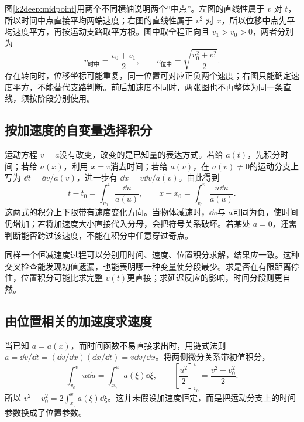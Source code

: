 图\ref{k2deep:midpoint}用两个不同横轴说明两个“中点”。左图的直线性属于 $v$ 对 $t$，所以时间中点直接平均两端速度；右图的直线性属于 $v^2$ 对 $x$，所以位移中点先平均速度平方，再按运动支路取平方根。图中取全程正向且 $v_1>v_0>0$，两者分别为
\[
 v_{\text{时中}}=\frac{v_0+v_1}{2},\qquad
 v_{\text{位中}}=\sqrt{\frac{v_0^2+v_1^2}{2}}.
\]
存在转向时，位移坐标可能重复，同一位置可对应正负两个速度；右图只能确定速度平方，不能替代支路判断。前后加速度不同时，两张图也不再整体为同一条直线，须按阶段分别使用。


\subsection{按加速度的自变量选择积分}
运动方程 $\dot v=a$没有改变，改变的是已知量的表达方式。若给 $a(t)$，先积分时间；若给 $a(x)$，利用 $\dot x=v$消去时间；若给 $a(v)$，在 $a(v)\ne0$的运动分支上写为 $\dd t=\dd v/a(v)$，进一步有 $\dd x=v\dd v/a(v)$。由此得到
\[t-t_0=\int_{v_0}^{v}\frac{\dd u}{a(u)},\qquad
x-x_0=\int_{v_0}^{v}\frac{u\dd u}{a(u)}.\]
这两式的积分上下限带有速度变化方向。当物体减速时，$\dd v$与 $a$可同为负，使时间仍增加；若将加速度大小直接代入分母，会把符号关系破坏。若某处 $a=0$，还需判断能否跨过该速度，不能在积分中任意穿过奇点。

同样一个恒减速度过程可以分别用时间、速度、位置积分求解，结果应一致。这种交叉检查能发现初值遗漏，也能表明哪一种变量使分段最少。求是否在有限距离停住，位置积分可能比求完整 $v(t)$更直接；求延迟反应的影响，时间分段则更自然。

\subsection{由位置相关的加速度求速度}
当已知 $a=a(x)$，而时间函数不易直接求出时，用链式法则 $a=\dd v/\dd t=(\dd v/\dd x)(\dd x/\dd t)=v\dd v/\dd x$。将两侧微分关系带初值积分，
\[
 \int_{v_0}^{v}u\dd u=\int_{x_0}^{x}a(\xi)\dd\xi,
 \qquad
 \left[\frac{u^2}{2}\right]_{v_0}^{v}=\frac{v^2-v_0^2}{2}.
\]
所以 $v^2-v_0^2=2\int_{x_0}^{x}a(\xi)\dd\xi$。这并未假设加速度恒定，而是把运动分支上的时间参数换成了位置参数。

